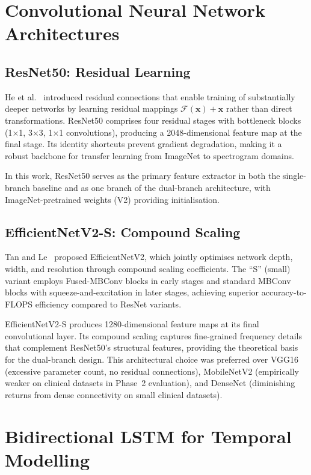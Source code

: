 \documentclass[oneside,openany]{final_report}
\begin{document}
\section{Convolutional Neural Network Architectures}

\subsection{ResNet50: Residual Learning}

He et al.~\cite{he2016} introduced residual connections that enable training of substantially deeper networks by learning residual mappings $\mathcal{F}(\mathbf{x}) + \mathbf{x}$ rather than direct transformations. ResNet50 comprises four residual stages with bottleneck blocks (1$\times$1, 3$\times$3, 1$\times$1 convolutions), producing a 2048-dimensional feature map at the final stage. Its identity shortcuts prevent gradient degradation, making it a robust backbone for transfer learning from ImageNet to spectrogram domains.

In this work, ResNet50 serves as the primary feature extractor in both the single-branch baseline and as one branch of the dual-branch architecture, with ImageNet-pretrained weights (V2) providing initialisation.

\subsection{EfficientNetV2-S: Compound Scaling}

Tan and Le~\cite{tan2021} proposed EfficientNetV2, which jointly optimises network depth, width, and resolution through compound scaling coefficients. The ``S'' (small) variant employs Fused-MBConv blocks in early stages and standard MBConv blocks with squeeze-and-excitation in later stages, achieving superior accuracy-to-FLOPS efficiency compared to ResNet variants.

EfficientNetV2-S produces 1280-dimensional feature maps at its final convolutional layer. Its compound scaling captures fine-grained frequency details that complement ResNet50's structural features, providing the theoretical basis for the dual-branch design. This architectural choice was preferred over VGG16 (excessive parameter count, no residual connections), MobileNetV2 (empirically weaker on clinical datasets in Phase~2 evaluation), and DenseNet (diminishing returns from dense connectivity on small clinical datasets).

\section{Bidirectional LSTM for Temporal Modelling}
\end{document}
